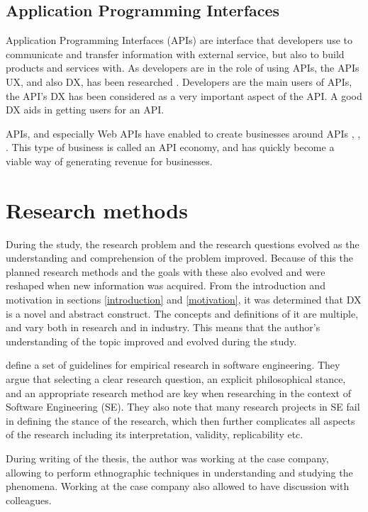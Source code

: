 \documentclass[english, 12pt, a4paper, sci, utf8, a-1b, online]{aaltothesis}
\begin{document}
\subsection{Application Programming Interfaces}

Application Programming Interfaces (APIs) are interface that developers use to communicate and transfer information with external service, but also to build products and services with. As developers are in the role of using APIs, the APIs UX, and also DX, has been researched \parencite{api-designers}. Developers are the main users of APIs, the API's DX has been considered as a very important aspect of the API. A good DX aids in getting users for an API.

APIs, and especially Web APIs have enabled to create businesses around APIs \parencite{api-ecosystem}, \parencite{web-api-economy}, \parencite{moilanen2018api}. This type of business is called an API economy, and has quickly become a viable way of generating revenue for businesses.

\clearpage
\section{Research methods}

During the study, the research problem and the research questions evolved as the understanding and comprehension of the problem improved. Because of this the planned research methods and the goals with these also evolved and were reshaped when new information was acquired. From the introduction and motivation in sections \ref{introduction} and \ref{motivation}, it was determined that DX is a novel and abstract construct. The concepts and definitions of it are multiple, and vary both in research and in industry. This means that the author's understanding of the topic improved and evolved during the study.

\textcite{easterbrook2008selecting} define a set of guidelines for empirical research in software engineering. They argue that selecting a clear research question, an explicit philosophical stance, and an appropriate research method are key when researching in the context of Software Engineering (SE). They also note that many research projects in SE fail in defining the stance of the research, which then further complicates all aspects of the research including its interpretation, validity, replicability etc.

During writing of the thesis, the author was working at the case company, allowing to perform ethnographic techniques in understanding and studying the phenomena. Working at the case company also allowed to have discussion with colleagues.
\end{document}
